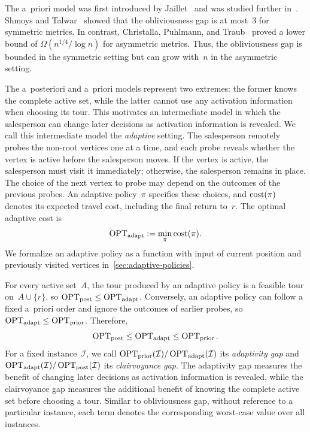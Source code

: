 \documentclass[12pt,a4paper,oneside]{report}
\begin{document}
The a~priori model was first introduced by Jaillet~\cite{Jaillet1985} and was
studied further in~\cite{Shmoys2008,Blauth2024,Christalla2025}. Shmoys and
Talwar~\cite{Shmoys2008} showed that the obliviousness gap is at most~$3$ for
symmetric metrics. In contrast, Christalla, Puhlmann, and
Traub~\cite{Christalla2025} proved a lower bound of
$\Omega(n^{1/4}/\log n)$ for asymmetric metrics. Thus, the obliviousness gap
is bounded in the symmetric setting but can grow with~$n$ in the asymmetric
setting. 

The a~posteriori and a~priori models represent two extremes: the
former knows the complete active set, while the latter cannot use any
activation information when choosing its tour. 
This motivates an intermediate
model in which the salesperson can change later decisions as activation
information is revealed.
We call this intermediate model the \emph{adaptive} setting. The salesperson
remotely probes the non-root vertices one at a time, and each probe reveals
whether the vertex is active before the salesperson moves. If the vertex is
active, the salesperson must visit it immediately; otherwise, the salesperson
remains in place. The choice of the next vertex to probe may depend on the
outcomes of the previous probes. An adaptive policy~$\pi$ specifies these
choices, and $\operatorname{cost}(\pi)$ denotes its expected travel cost, including the final
return to~$r$. The optimal adaptive cost is
\[
    \operatorname{OPT}_\mathrm{adapt}:=\min_\pi\operatorname{cost}(\pi).
\]
We formalize an adaptive policy as a function with input of current position and 
previously visited vertices in~\cref{sec:adaptive-policies}.

For every active set~$A$, the tour produced by an adaptive policy is a feasible
tour on~$A\cup\{r\}$, so $\operatorname{OPT}_\mathrm{post}\le\operatorname{OPT}_\mathrm{adapt}$. Conversely, an adaptive
policy can follow a fixed a~priori order and ignore the outcomes of earlier
probes, so $\operatorname{OPT}_\mathrm{adapt}\le\operatorname{OPT}_\mathrm{prior}$. Therefore,
\begin{equation}\label{eq:optineq}
    \operatorname{OPT}_\mathrm{post}\le\operatorname{OPT}_\mathrm{adapt}\le\operatorname{OPT}_\mathrm{prior}.
\end{equation}
For a fixed instance~$\mathcal I$, we call
$\operatorname{OPT}_\mathrm{prior}(\mathcal I)/\operatorname{OPT}_\mathrm{adapt}(\mathcal I)$ its \emph{adaptivity gap} and
$\operatorname{OPT}_\mathrm{adapt}(\mathcal I)/\operatorname{OPT}_\mathrm{post}(\mathcal I)$ its \emph{clairvoyance gap}.
The adaptivity gap measures the benefit of changing later decisions as
activation information is revealed, while the clairvoyance gap measures the
additional benefit of knowing the complete active set before choosing a tour.
Similar to obliviousness gap, without reference to a particular instance, 
each term denotes the corresponding worst-case value over all \StochTSP{} instances.
\end{document}

